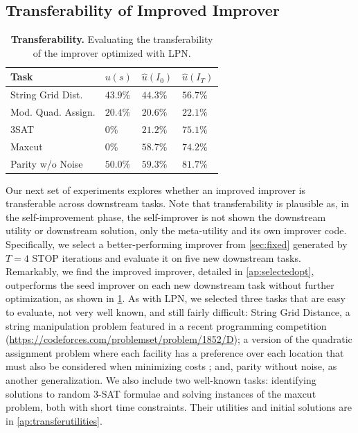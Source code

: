 \documentclass{article} %
\newcommand{\metautil}{{\hat{u}}}
\newcommand{\sol}{{s}}
\begin{document}
%
%

\vspace{15px}
\null

\vspace{-20px}
\subsection{Transferability of Improved Improver}
%

%
%
%
%
%
%
%
%
%
%
%
%
%
%
%
%
%
%
%
%
\begin{table}
%
\vspace{-5px}
\caption{\textbf{Transferability.} Evaluating the transferability of the improver optimized with LPN.\vspace{-6px}}
\label{tbl:transfer}
\begin{tabular}{llll}
\toprule
Task                    & $u(\sol)$ & $\metautil(I_0)$ & $\metautil(I_T)$ \\
\midrule
String Grid Dist.           & $43.9\%$          & $44.3\%$      &   $56.7\%$   \\
Mod. Quad. Assign.          & $20.4\% $         & $20.6\%$      &   $22.1\%$       \\
3SAT                        & $0\%$            & $21.2\%$      &   $75.1\%$      \\
Maxcut                      & $0\%$              & $58.7\%$      &   $74.2\%$      \\
Parity w/o Noise            & $50.0\%$            & $59.3\%$      &   $81.7\%$       \\
%
\bottomrule
\end{tabular}
\vspace{-5pt}
\end{table}
%


Our next set of experiments explores whether an improved improver is transferable across downstream tasks.
Note that transferability is plausible as, in the self-improvement phase, the self-improver is not shown the downstream utility or downstream solution, only the meta-utility and its own improver code.
Specifically, we select a better-performing improver from \cref{sec:fixed} generated by $T=4$ STOP iterations and evaluate it on five new downstream tasks. 
Remarkably, we find the improved improver, detailed in \cref{ap:selectedopt}, outperforms the seed improver on each new downstream task without further optimization, as shown in \cref{tbl:transfer}.
As with LPN, we selected three tasks that are easy to evaluate, not very well known, and still fairly difficult: String Grid Distance, a string manipulation problem featured in a recent programming competition (\url{https://codeforces.com/problemset/problem/1852/D}); a version of the quadratic assignment problem where each facility has a preference over each location that must also be considered when minimizing costs \citep{koopmans1957assignment}; and, parity without noise, as another generalization. We also include two well-known tasks: identifying solutions to random 3-SAT formulae and solving instances of the maxcut problem, both with short time constraints. Their utilities and initial solutions are in \cref{ap:transferutilities}.%
\end{document}
